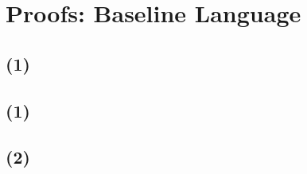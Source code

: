 \section{Proofs: Baseline Language}
\label{app:baseline}


\subsection{}
\label{app:proofs:varlookup}
\setcounter{equation}{0}


\subsection{}
\label{app:proofs:close-defs-eq}
\setcounter{equation}{0}


\subsection{ (1)}
\label{app:proofs:matching-bi-1}
\setcounter{equation}{0}


\subsection{ (1)}
\label{app:semantics-eq-1}
\setcounter{equation}{0}


\subsection{ (2)}
\label{app:semantics-eq-2}
\setcounter{equation}{0}


\clearpage
